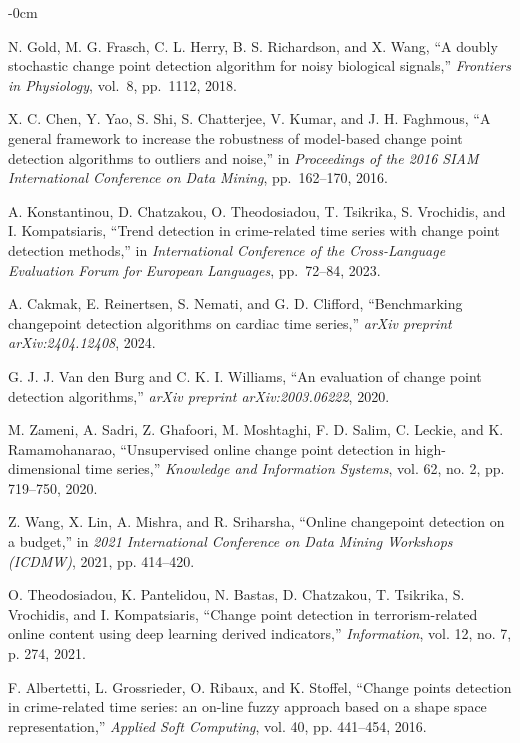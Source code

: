 \documentclass[journal,article,submit,pdftex,moreauthors]{Definitions/mdpi}
\begin{document}
\begin{adjustwidth}{-\extralength}{0cm}
\begin{thebibliography}{999}
N. Gold, M. G. Frasch, C. L. Herry, B. S. Richardson, and X. Wang,
``A doubly stochastic change point detection algorithm for noisy biological signals,''
\textit{Frontiers in Physiology}, vol.~8, pp.~1112, 2018.

X. C. Chen, Y. Yao, S. Shi, S. Chatterjee, V. Kumar, and J. H. Faghmous,
``A general framework to increase the robustness of model-based change point detection algorithms to outliers and noise,''
in \textit{Proceedings of the 2016 SIAM International Conference on Data Mining}, pp.~162--170, 2016.

A. Konstantinou, D. Chatzakou, O. Theodosiadou, T. Tsikrika, S. Vrochidis, and I. Kompatsiaris,
``Trend detection in crime-related time series with change point detection methods,''
in \textit{International Conference of the Cross-Language Evaluation Forum for European Languages}, pp.~72--84, 2023.


A. Cakmak, E. Reinertsen, S. Nemati, and G. D. Clifford, ``Benchmarking changepoint detection algorithms on cardiac time series,'' \emph{arXiv preprint arXiv:2404.12408}, 2024.

G. J. J. Van den Burg and C. K. I. Williams, ``An evaluation of change point detection algorithms,'' \emph{arXiv preprint arXiv:2003.06222}, 2020.

M. Zameni, A. Sadri, Z. Ghafoori, M. Moshtaghi, F. D. Salim, C. Leckie, and K. Ramamohanarao, ``Unsupervised online change point detection in high-dimensional time series,'' \emph{Knowledge and Information Systems}, vol. 62, no. 2, pp. 719--750, 2020.

Z. Wang, X. Lin, A. Mishra, and R. Sriharsha, ``Online changepoint detection on a budget,'' in \emph{2021 International Conference on Data Mining Workshops (ICDMW)}, 2021, pp. 414--420.

O. Theodosiadou, K. Pantelidou, N. Bastas, D. Chatzakou, T. Tsikrika, S. Vrochidis, and I. Kompatsiaris, ``Change point detection in terrorism-related online content using deep learning derived indicators,'' \emph{Information}, vol. 12, no. 7, p. 274, 2021.

F. Albertetti, L. Grossrieder, O. Ribaux, and K. Stoffel, ``Change points detection in crime-related time series: an on-line fuzzy approach based on a shape space representation,'' \emph{Applied Soft Computing}, vol. 40, pp. 441--454, 2016.


\end{thebibliography}
\end{adjustwidth}
\end{document}
